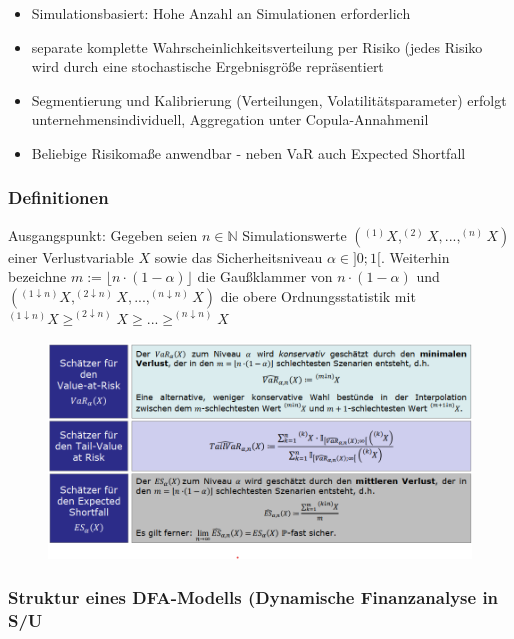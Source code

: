 \documentclass[12pt]{report}
\theoremstyle{dotless}
\theoremstyle{definition}
\begin{document}
\begin{itemize}
\item Simulationsbasiert: Hohe Anzahl an Simulationen erforderlich
\item separate komplette Wahrscheinlichkeitsverteilung per Risiko (jedes Risiko wird durch eine stochastische Ergebnisgröße repräsentiert
\item Segmentierung und Kalibrierung (Verteilungen, Volatilitätsparameter) erfolgt unternehmensindividuell, Aggregation unter Copula-Annahmenil
\item Beliebige Risikomaße anwendbar - neben VaR auch Expected Shortfall
\end{itemize}


\subsubsection{Definitionen}
Ausgangspunkt: Gegeben seien $n \in \mathbb{N}$ Simulationswerte $(^{(1)}X, ^{(2)}X, ..., ^{(n)}X)$ einer Verlustvariable $X$ sowie das Sicherheitsniveau $\alpha \in ]0;1[$. Weiterhin bezeichne $m:= \lfloor n \cdot (1- \alpha) \rfloor$ die Gaußklammer von $n \cdot (1- \alpha)$ und $(^{(1\downarrow n)}X, ^{(2\downarrow n)}X, ..., ^{(n\downarrow n)}X)$ die obere Ordnungsstatistik mit $^{(1\downarrow n)} X \geq ^{(2\downarrow n)} X \geq ... \geq ^{(n\downarrow n)} X$

\begin{figure}[ht]
	\centering
	\includegraphics[width= \textwidth]{Bilder/Definitionen1.png}
\end{figure}

\subsubsection{Struktur eines DFA-Modells (Dynamische Finanzanalyse in S/U}
\end{document}
